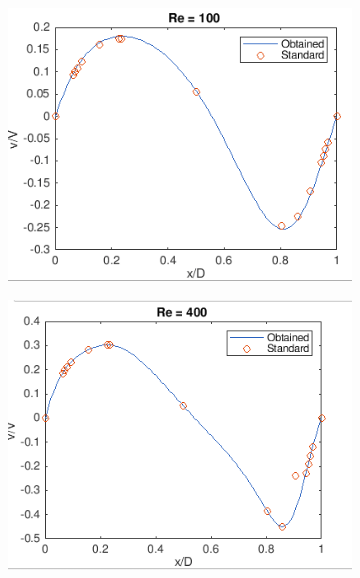 \documentclass{article}
\begin{document}
\begin{figure}
  \begin{subfigure}[b]{0.3\textwidth}
    \includegraphics[width=\textwidth]{41.png}
  \end{subfigure}
  \begin{subfigure}[b]{0.3\textwidth}
    \includegraphics[width=\textwidth]{42.png}
  \end{subfigure}
 \begin{subfigure}[b]{0.3\textwidth}

\end{subfigure}
\end{figure}
\end{document}
